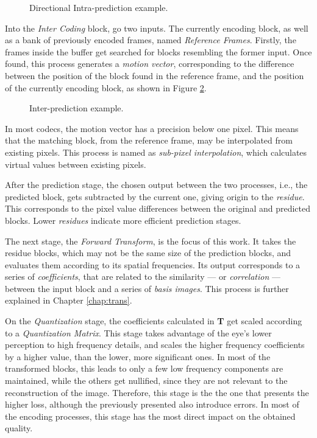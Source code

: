 \begin{figure}[!htbp]
    \centering
    
    \caption{Directional Intra-prediction example.}
    \label{fig:intraex}
\end{figure}

Into the \emph{Inter Coding} block, go two inputs. The currently encoding block, as well as a bank of previously encoded frames, named \emph{Reference Frames}. Firstly, the frames inside the buffer get searched for blocks resembling the former input. Once found, this process generates a \emph{motion vector}, corresponding to the difference between the position of the block found in the reference frame, and the position of the currently encoding block, as shown in Figure \ref{fig:interex}.

\begin{figure}[!htbp]
    \centering
    
    \caption{Inter-prediction example.}
    \label{fig:interex}
\end{figure}

In most codecs, the motion vector has a precision below one pixel. This means that the matching block, from the reference frame, may be interpolated from existing pixels. This process is named as \emph{sub-pixel interpolation}, which calculates virtual values between existing pixels. 

After the prediction stage, the chosen output between the two processes, i.e., the predicted block, gets subtracted by the current one, giving origin to the \emph{residue}. This corresponds to the pixel value differences between the original and predicted blocks. Lower \emph{residues} indicate more efficient prediction stages.

The next stage, the \emph{Forward Transform}, is the focus of this work. It takes the residue blocks, which may not be the same size of the prediction blocks, and evaluates them according to its spatial frequencies. Its output corresponds to a series of \emph{coefficients}, that are related to the similarity --- or \emph{correlation} --- between the input block and a series of \emph{basis images}. This process is further explained in Chapter \ref{chap:trans}.

On the \emph{Quantization} stage, the coefficients calculated in \textbf{T} get scaled according to a \emph{Quantization Matrix}. This stage takes advantage of the eye's lower perception to high frequency details, and scales the higher frequency coefficients by a higher value, than the lower, more significant ones. In most of the transformed blocks, this leads to only a few low frequency components are maintained, while the others get nullified, since they are not relevant to the reconstruction of the image. Therefore, this stage is the the one that presents the higher loss, although the previously presented also introduce errors. In most of the encoding processes, this stage has the most direct impact on the obtained quality.

